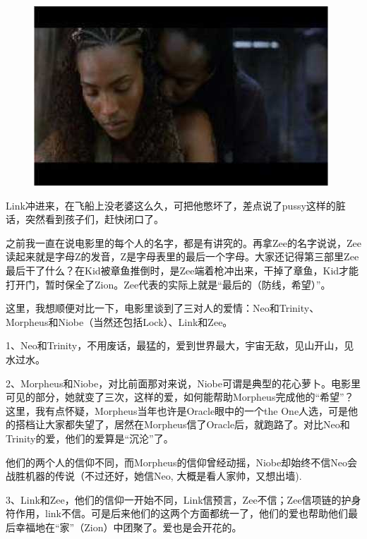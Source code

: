 \documentclass[UTF8]{ctexart}
\begin{document}
\begin{figure}[htb]
\centering
\includegraphics[width=0.5\linewidth]{fig/read_reloaded-39}
\end{figure}

Link冲进来，在飞船上没老婆这么久，可把他憋坏了，差点说了pussy这样的脏话，突然看到孩子们，赶快闭口了。

之前我一直在说电影里的每个人的名字，都是有讲究的。再拿Zee的名字说说，Zee读起来就是字母Z的发音，Z是字母表里的最后一个字母。大家还记得第三部里Zee最后干了什么？在Kid被章鱼推倒时，是Zee端着枪冲出来，干掉了章鱼，Kid才能打开门，暂时保全了Zion。Zee代表的实际上就是“最后的（防线，希望）”。

这里，我想顺便对比一下，电影里谈到了三对人的爱情：Neo和Trinity、Morpheus和Niobe（当然还包括Lock）、Link和Zee。

1、Neo和Trinity，不用废话，最猛的，爱到世界最大，宇宙无敌，见山开山，见水过水。

2、Morpheus和Niobe，对比前面那对来说，Niobe可谓是典型的花心萝卜。电影里可见的部分，她就变了三次，这样的爱，如何能帮助Morpheus完成他的“希望”？这里，我有点怀疑，Morpheus当年也许是Oracle眼中的一个the One人选，可是他的搭档让大家都失望了，居然在Morpheus信了Oracle后，就跑路了。对比Neo和Trinity的爱，他们的爱算是“沉沦”了。

他们的两个人的信仰不同，而Morpheus的信仰曾经动摇，Niobe却始终不信Neo会战胜机器的传说（不过还好，她信Neo, 大概是看人家帅，又想出墙).

3、Link和Zee，他们的信仰一开始不同，Link信预言，Zee不信；Zee信项链的护身符作用，link不信。可是后来他们的这两个方面都统一了，他们的爱也帮助他们最后幸福地在“家”（Zion）中团聚了。爱也是会开花的。
\end{document}
